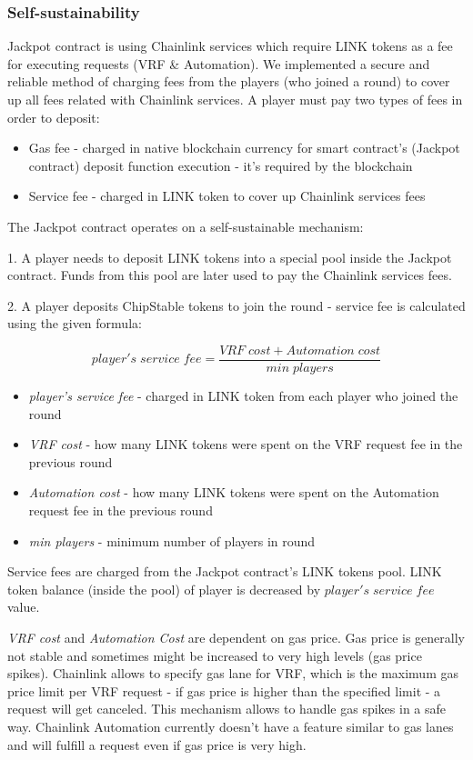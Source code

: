 \documentclass[12pt]{article}
\begin{document}
\subsubsection{Self-sustainability}
Jackpot contract is using Chainlink services which require LINK tokens as a fee for executing requests (VRF \& Automation). We implemented a secure and reliable method of charging fees from the players (who joined a round) to cover up all fees related with Chainlink services. A player must pay two types of fees in order to deposit:
\begin{itemize}
    \item Gas fee - charged in native blockchain currency for smart contract's (Jackpot contract) deposit function execution - it's required by the blockchain
    \item Service fee - charged in LINK token to cover up Chainlink services fees
\end{itemize}

The Jackpot contract operates on a self-sustainable mechanism:

1. A player needs to deposit LINK tokens into a special pool inside the Jackpot contract. Funds from this pool are later used to pay the Chainlink services fees.

2. A player deposits ChipStable tokens to join the round - service fee is calculated using the given formula:

\[ player's\;service\;fee = \frac{VRF\;cost + Automation\;cost}{min\;players} \]

\begin{itemize}
    \item \textit{player's service fee} - charged in LINK token from each player who joined the round
    \item \textit{VRF cost} - how many LINK tokens were spent on the VRF request fee in the previous round
    \item \textit{Automation cost} - how many LINK tokens were spent on the Automation request fee in the previous round
    \item \textit{min players} - minimum number of players in round
\end{itemize}

Service fees are charged from the Jackpot contract's LINK tokens pool. LINK token balance (inside the pool) of player is decreased by \(player's\;service\;fee\) value.

\hfill

\textit{VRF cost} and \textit{Automation Cost} are dependent on gas price\cite{gas}. Gas price is generally not stable and sometimes might be increased to very high levels (gas price spikes). Chainlink allows to specify gas lane for VRF, which is the maximum gas price limit per VRF request - if gas price is higher than the specified limit - a request will get canceled. This mechanism allows to handle gas spikes in a safe way. Chainlink Automation currently doesn't have a feature similar to gas lanes and will fulfill a request even if gas price is very high. 
\end{document}

